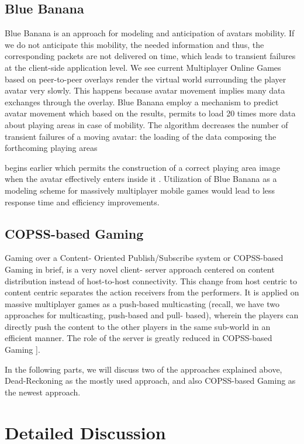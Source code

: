\documentclass[conference]{IEEEtran}
\begin{document}
\subsection{Blue Banana}
Blue Banana is an approach for modeling and anticipation of avatars mobility. If we do not anticipate this mobility, the needed information and thus, the corresponding packets are not delivered on time, which leads to transient failures at the client-side application level. We see current Multiplayer Online Games based on peer-to-peer overlays render the virtual world surrounding the player avatar very slowly. This happens because avatar movement implies many data exchanges through the overlay. Blue Banana employ a mechanism to predict avatar movement which based on the results, permits to load 20 times more data about playing  areas  in case of mobility. The algorithm decreases the number of transient failures  of  a  moving  avatar:  the  loading of  the  data  composing  the  forthcoming  playing  areas
 
begins earlier which permits the construction of a correct playing area image when the avatar effectively enters inside it \cite{r28}. Utilization of Blue Banana as a modeling scheme for massively multiplayer mobile games would lead to less response time and efficiency improvements.

\subsection{COPSS-based Gaming}
Gaming over a Content- Oriented Publish/Subscribe system or COPSS-based Gaming in brief, is a very novel client- server approach centered on content distribution instead of host-to-host connectivity. This change from host centric to content centric separates the action receivers from the performers. It is applied on massive multiplayer games as a push-based multicasting (recall, we have two approaches for multicasting, push-based and pull- based), wherein the players can directly push the content to the other players in the same sub-world in an efficient manner. The role of the server is greatly reduced in COPSS-based Gaming \cite{r29}].

In the following parts, we will discuss two of the approaches explained above, Dead-Reckoning as the mostly used approach, and also COPSS-based Gaming as the newest approach.

\section{Detailed Discussion}
\end{document}
